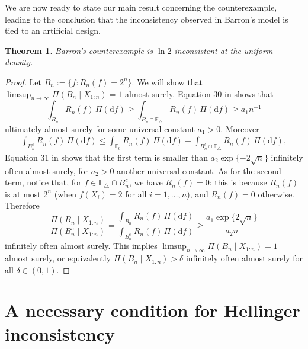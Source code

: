 \documentclass[11pt,twoside]{article}
\newtheorem{theorem}{Theorem}
\begin{document}
We are now ready to state our main result concerning the counterexample, leading to the conclusion that the inconsistency observed in Barron's model is tied to an artificial design.

\begin{theorem}
    Barron's counterexample is $\ln 2$-inconsistent at the uniform density.
\end{theorem}



\begin{proof}
    Let $B_n:= \{f : R_n(f) = 2^n\}$. We will show that $\limsup_{n\to\infty}\Pi(B_n\mid X_{1:n})=1$ almost surely. Equation 30 in \cite{barron1999consistency} shows that
    \begin{equation*}
        \int_{B_n} R_n(f)\, \Pi(\mathrm df) \geq \int_{B_n\cap\mathbb F_\triangle} R_n(f)\, \Pi(\mathrm df) \geq a_1 n^{-1}
    \end{equation*}
    ultimately almost surely for some universal constant $a_1>0$. Moreover
    \begin{align*}
        \int_{B_n^c} R_n(f)\, \Pi(\mathrm df)  \leq \int_{\mathbb F_0} R_n(f)\, \Pi(\mathrm df) + \int_{B_n^c\cap \mathbb F_\triangle} R_n(f)\, \Pi(\mathrm df),
    \end{align*}
    Equation 31 in \cite{barron1999consistency} shows that the first term is smaller than $a_2\exp\{-2\sqrt n\}$ infinitely often almost surely, for $a_2>0$ another universal constant. As for the second term, notice that, for $f\in\mathbb F_\triangle\cap B_n^c$, we have $R_n(f)=0$: this is because $R_n(f)$ is at most $2^n$ (when $f(X_i)=2$ for all $i=1,\dots,n$), and $R_n(f)=0$ otherwise. Therefore
    \begin{equation*}
        \frac{\Pi(B_n \mid X_{1:n})}{\Pi(B_n^c \mid X_{1:n})} = \frac{\int_{B_n} R_n(f)\, \Pi(\mathrm df)}{\int_{B_n^c} R_n(f)\, \Pi(\mathrm df)} \geq \frac{a_1\exp\{2\sqrt n\}}{a_2 n}
    \end{equation*}
    infinitely often almost surely. This implies $\limsup_{n\to\infty}\Pi(B_n\mid X_{1:n})=1$ almost surely, or equivalently $\Pi(B_n\mid X_{1:n})>\delta$ infinitely often almost surely for all $\delta\in(0,1)$.
\end{proof}




\section{A necessary condition for Hellinger inconsistency}\label{sec:necessary_condition}
\end{document}
